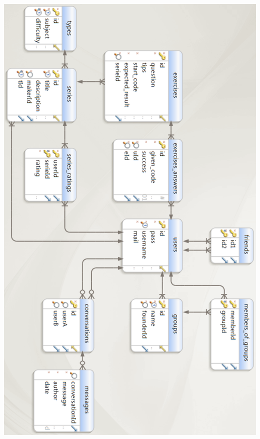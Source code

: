 \hbox{\hspace{-6ex}\includegraphics[keepaspectratio=true, angle=90, scale=0.33]{raport_files/design/UML.png}}


